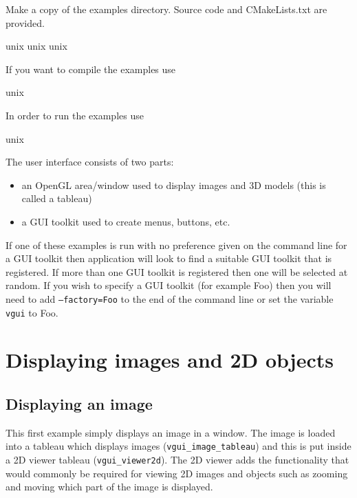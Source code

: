 \documentclass[12pt]{report}
\begin{document}
Make a copy of the examples directory.  Source code and CMakeLists.txt are provided.
\scriptsize
\begin{verbawf}
  unix%
  unix%
  unix%
\end{verbawf}
\normalsize

If you want to compile the examples use
\scriptsize
\begin{verbawf}
  unix%
\end{verbawf}
\normalsize

In order to run the examples use
\scriptsize
\begin{verbawf}
  unix%
\end{verbawf}
\normalsize

The user interface consists of two parts:
\begin{itemize}
\item an OpenGL area/window used to display images and 3D models
(this is called a tableau)
\item a GUI toolkit used to create menus, buttons, etc.
\end{itemize}

If one of these examples is run with no preference given on the command line
for a GUI toolkit then application will look to find a suitable GUI toolkit that is
registered.  If more than one GUI toolkit is registered then one will be selected at
random.  If you wish to specify a GUI toolkit (for example Foo) then you will need to add
{\tt --factory=Foo} to the end of the command line or set the variable
{\tt vgui} to Foo.

\chapter{Displaying images and 2D objects}

\section{Displaying an image}
This first example simply displays an image in a window.
The image is loaded into a tableau which displays images ({\tt vgui\_image\_tableau})
and this is put inside a 2D viewer tableau ({\tt vgui\_viewer2d}).  The 2D viewer
adds the functionality that would commonly be required for viewing 2D images
and objects such as zooming and moving which part of the image is displayed.
\end{document}
